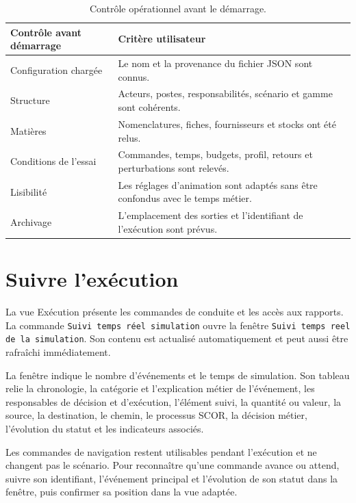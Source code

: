 \begin{table}[H]
  \centering
  \begin{tabularx}{\textwidth}{L{0.31\textwidth} Y}
    \toprule
    Contrôle avant démarrage & Critère utilisateur \\
    \midrule
    Configuration chargée & Le nom et la provenance du fichier JSON sont connus. \\
    Structure & Acteurs, postes, responsabilités, scénario et gamme sont cohérents. \\
    Matières & Nomenclatures, fiches, fournisseurs et stocks ont été relus. \\
    Conditions de l'essai & Commandes, temps, budgets, profil, retours et perturbations sont relevés. \\
    Lisibilité & Les réglages d'animation sont adaptés sans être confondus avec le temps métier. \\
    Archivage & L'emplacement des sorties et l'identifiant de l'exécution sont prévus. \\
    \bottomrule
  \end{tabularx}
  \caption{Contrôle opérationnel avant le démarrage.}
  \label{tab:controle-demarrage}
\end{table}

\section{Suivre l'exécution}

La vue Exécution présente les commandes de conduite et les accès aux rapports. La commande \texttt{Suivi temps réel simulation} ouvre la fenêtre \texttt{Suivi temps reel de la simulation}. Son contenu est actualisé automatiquement et peut aussi être rafraîchi immédiatement.


La fenêtre indique le nombre d'événements et le temps de simulation. Son tableau relie la chronologie, la catégorie et l'explication métier de l'événement, les responsables de décision et d'exécution, l'élément suivi, la quantité ou valeur, la source, la destination, le chemin, le processus SCOR, la décision métier, l'évolution du statut et les indicateurs associés.

Les commandes de navigation restent utilisables pendant l'exécution et ne changent pas le scénario. Pour reconnaître qu'une commande avance ou attend, suivre son identifiant, l'événement principal et l'évolution de son statut dans la fenêtre, puis confirmer sa position dans la vue adaptée.

